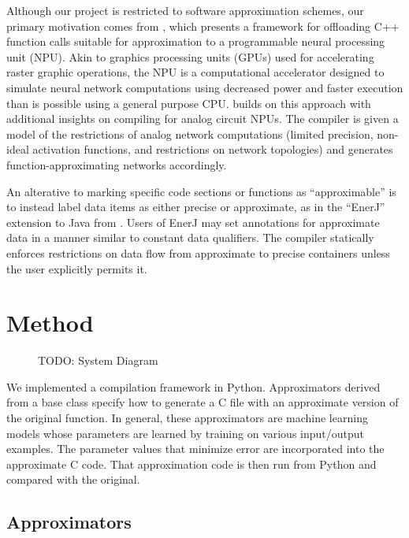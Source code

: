 \documentclass{article}
\begin{document}
Although our project is restricted to software approximation schemes, our primary motivation comes from \cite{Esmaeilzadeh12}, which presents a framework for offloading C++ function calls suitable for approximation to a programmable neural processing unit (NPU). Akin to graphics processing units (GPUs) used for accelerating raster graphic operations, the NPU is a computational accelerator designed to simulate neural network computations using decreased power and faster execution than is possible using a general purpose CPU. \cite{Amant14} builds on this approach with additional insights on compiling for analog circuit NPUs. The compiler is given a model of the restrictions of analog network computations (limited precision, non-ideal activation functions, and restrictions on network topologies) and generates function-approximating networks accordingly.

An alterative to marking specific code sections or functions as ``approximable'' is to instead label data items as either precise or approximate, as in the ``EnerJ'' extension to Java from \cite{Sampson11}. Users of EnerJ may set annotations for approximate data in a manner similar to constant data qualifiers. The compiler statically enforces restrictions on data flow from approximate to precise containers unless the user explicitly permits it.

\section{Method}

\begin{figure}
  \centering
  \caption{TODO: System Diagram}
\end{figure}

We implemented a compilation framework in Python. Approximators derived from a base class specify how to generate a C file with an approximate version of the original function. In general, these approximators are machine learning models whose parameters are learned by training on various input/output examples. The parameter values that minimize error are incorporated into the approximate C code. That approximation code is then run from Python and compared with the original.

\subsection{Approximators}
\end{document}
